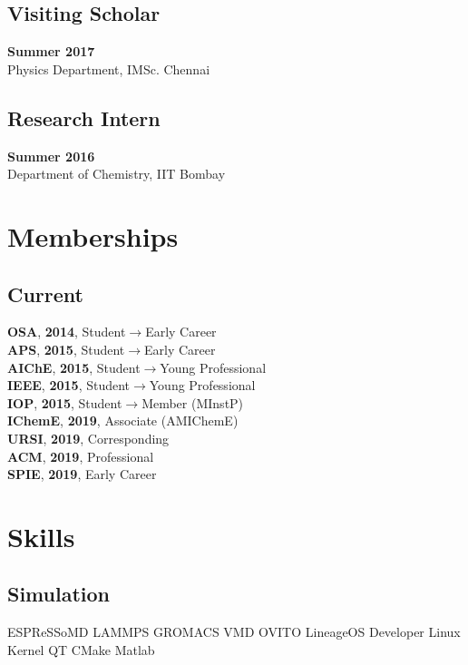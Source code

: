 \documentclass[letterpaper]{deedy-resume} %
\begin{document}
\begin{minipage}[t]{0.36\textwidth}
	\subsection{Visiting Scholar}
	\textbf{Summer 2017}\\ Physics Department, IMSc. Chennai
	\subsection{Research Intern}
	\textbf{Summer 2016}\\ Department of Chemistry, IIT Bombay


	\vspace{-5pt}
	\section{Memberships}
	\subsection{Current}
	\textbf{OSA}, \textbf{2014}, Student$\to$Early Career\\
	\textbf{APS}, \textbf{2015}, Student$\to$Early Career\\
	\textbf{AIChE}, \textbf{2015}, Student$\to$Young Professional\\
	\textbf{IEEE}, \textbf{2015}, Student$\to$Young Professional\\
	\textbf{IOP}, \textbf{2015}, Student$\to$Member (MInstP)\\
	\textbf{IChemE}, \textbf{2019}, Associate (AMIChemE)\\
	\textbf{URSI}, \textbf{2019}, Corresponding \\
	\textbf{ACM}, \textbf{2019}, Professional \\
	\textbf{SPIE}, \textbf{2019}, Early Career \\



	\section{Skills}
	\subsection{Simulation}
	ESPReSSoMD \textbullet{} LAMMPS \textbullet{} GROMACS \textbullet{} VMD \textbullet{} OVITO\textbullet{} LineageOS Developer\textbullet{} Linux Kernel\textbullet{} QT\textbullet{} CMake\textbullet{} Matlab\\

\end{minipage}
\end{document}
